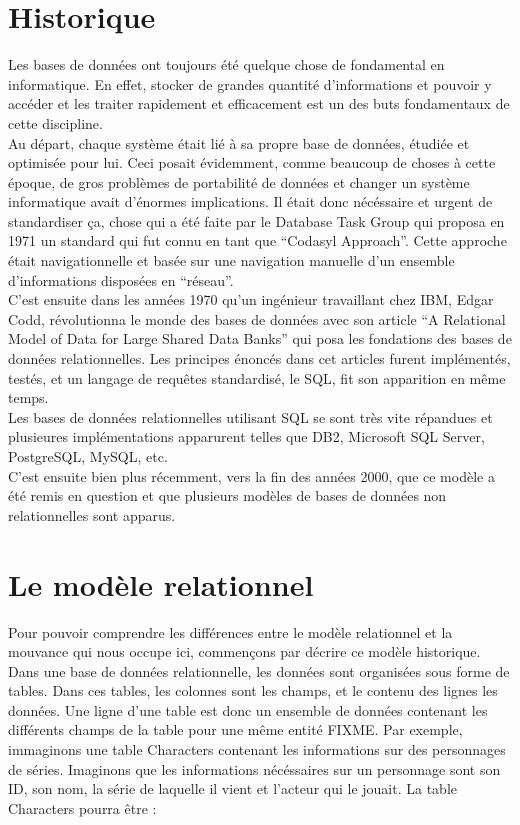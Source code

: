 \documentclass[11pt]{article}
\begin{document}
\section{Historique}
Les bases de données ont toujours été quelque chose de fondamental en informatique. En effet, stocker de grandes quantité d'informations et pouvoir y accéder et les traiter rapidement et efficacement est un des buts fondamentaux de cette discipline. \\
Au départ, chaque système était lié à sa propre base de données, étudiée et optimisée pour lui. Ceci posait évidemment, comme beaucoup de choses à cette époque, de gros problèmes de portabilité de données et changer un système informatique avait d'énormes implications. Il était donc nécéssaire et urgent de standardiser ça, chose qui a été faite par le Database Task Group qui proposa en 1971 un standard qui fut connu en tant que ``Codasyl Approach''. Cette approche était navigationnelle et basée sur une navigation manuelle d'un ensemble d'informations disposées en ``réseau''. \\
C'est ensuite dans les années 1970 qu'un ingénieur travaillant chez IBM, Edgar Codd, révolutionna le monde des bases de données avec son article ``A Relational Model of Data for Large Shared Data Banks'' qui posa les fondations des bases de données relationnelles. Les principes énoncés dans cet articles furent implémentés, testés, et un langage de requêtes standardisé, le SQL, fit son apparition en même temps. \\
Les bases de données relationnelles utilisant SQL se sont très vite répandues et plusieures implémentations apparurent telles que DB2, Microsoft SQL Server, PostgreSQL, MySQL, etc. \\
C'est ensuite bien plus récemment, vers la fin des années 2000, que ce modèle a été remis en question et que plusieurs modèles de bases de données non relationnelles sont apparus.
\section{Le modèle relationnel}
Pour pouvoir comprendre les différences entre le modèle relationnel et la mouvance qui nous occupe ici, commençons par décrire ce modèle historique. \\
Dans une base de données relationnelle, les données sont organisées sous forme de tables. Dans ces tables, les colonnes sont les champs, et le contenu des lignes les données. Une ligne d'une table est donc un ensemble de données contenant les différents champs de la table pour une même entité FIXME. Par exemple, immaginons une table Characters contenant les informations sur des personnages de séries. Imaginons que les informations nécéssaires sur un personnage sont son ID, son nom, la série de laquelle il vient et l'acteur qui le jouait. La table Characters pourra être : \\
\end{document}
